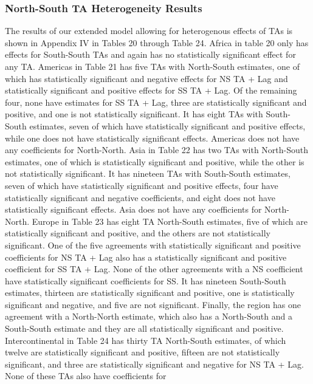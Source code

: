 \subsubsection{North{-}South TA Heterogeneity Results}%
\label{ssubsec:North{-}SouthTAHeterogeneityResults}%
The results of our extended model allowing for heterogenous effects of
TAs is shown in Appendix IV in Tables 20 through Table 24. Africa in
table 20 only has effects for South-South TAs and again has no
statistically significant effect for any TA. Americas in Table 21 has
five TAs with North-South estimates, one of which has statistically
significant and negative effects for NS TA + Lag and statistically
significant and positive effects for SS TA + Lag. Of the remaining four,
none have estimates for SS TA + Lag, three are statistically significant
and positive, and one is not statistically significant. It has eight TAs
with South-South estimates, seven of which have statistically
significant and positive effects, while one does not have statistically
significant effects. Americas does not have any coefficients for
North-North. Asia in Table 22 has two TAs with North-South estimates,
one of which is statistically significant and positive, while the other
is not statistically significant. It has nineteen TAs with South-South
estimates, seven of which have statistically significant and positive
effects, four have statistically significant and negative coefficients,
and eight does not have statistically significant effects. Asia does not
have any coefficients for North-North. Europe in Table 23 has eight TA
North-South estimates, five of which are statistically significant and
positive, and the others are not statistically significant. One of the
five agreements with statistically significant and positive coefficients
for NS TA + Lag also has a statistically significant and positive
coefficient for SS TA + Lag. None of the other agreements with a NS
coefficient have statistically significant coefficients for SS. It has
nineteen South-South estimates, thirteen are statistically significant
and positive, one is statistically significant and negative, and five
are not significant. Finally, the region has one agreement with a
North-North estimate, which also has a North-South and a South-South
estimate and they are all statistically significant and positive.
Intercontinental in Table 24 has thirty TA North-South estimates, of
which twelve are statistically significant and positive, fifteen are not
statistically significant, and three are statistically significant and
negative for NS TA + Lag. None of these TAs also have coefficients for
